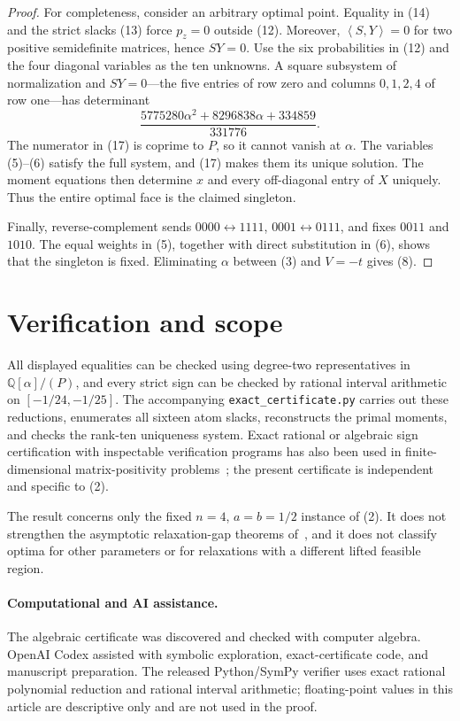 \documentclass[11pt]{article}
\newcommand{\ip}[2]{\left\langle #1,#2\right\rangle}
\begin{document}
\begin{proof}
For completeness, consider an arbitrary optimal point.  Equality in (14)
and the strict slacks (13) force $p_z=0$ outside (12).  Moreover,
$\ip{S}{Y}=0$ for two positive semidefinite matrices, hence $SY=0$.
Use the six probabilities in (12) and the four diagonal variables as the
ten unknowns.  A square subsystem of normalization and $SY=0$---the five
entries of row zero and columns $0,1,2,4$ of row one---has determinant
\begin{equation}
\frac{5775280\alpha^2+8296838\alpha+334859}{331776}.               \tag{17}
\end{equation}
The numerator in (17) is coprime to $P$, so it cannot vanish at $\alpha$.
The variables (5)--(6) satisfy the full system, and (17) makes them its
unique solution.  The moment equations then determine $x$ and every
off-diagonal entry of $X$ uniquely.  Thus the entire optimal face is the
claimed singleton.

Finally, reverse-complement sends
$0000\leftrightarrow1111$, $0001\leftrightarrow0111$, and fixes $0011$
and $1010$.  The equal weights in (5), together with direct substitution
in (6), shows that the singleton is fixed.  Eliminating $\alpha$ between
(3) and $V=-t$ gives (8).
\end{proof}

\section{Verification and scope}

All displayed equalities can be checked using degree-two representatives in
$\mathbb{Q}[\alpha]/(P)$, and every strict sign can be checked by rational
interval arithmetic on $[-1/24,-1/25]$.  The accompanying
\texttt{exact\_certificate.py} carries out these reductions, enumerates all
sixteen atom slacks, reconstructs the primal moments, and checks the rank-ten
uniqueness system.  Exact rational or algebraic sign certification with
inspectable verification programs has also been used in finite-dimensional
matrix-positivity problems~\cite{ZengEtAl2026}; the present certificate is
independent and specific to (2).

The result concerns only the fixed $n=4$, $a=b=1/2$ instance of (2).  It
does not strengthen the asymptotic relaxation-gap theorems
of~\cite{ZhangWang2026}, and it does not classify optima for other parameters
or for relaxations with a different lifted feasible region.

\paragraph{Computational and AI assistance.}
The algebraic certificate was discovered and checked with computer algebra.
OpenAI Codex assisted with symbolic exploration, exact-certificate code, and
manuscript preparation.  The released Python/SymPy verifier uses exact rational
polynomial reduction and rational interval arithmetic; floating-point values in
this article are descriptive only and are not used in the proof.

\small


\end{document}
